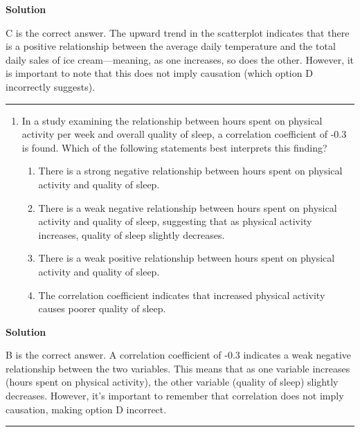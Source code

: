 \documentclass[
  letterpaper,
  DIV=11,
  numbers=noendperiod,
  oneside]{scrreprt}
\providecommand{\tightlist}{%
  \setlength{\itemsep}{0pt}\setlength{\parskip}{0pt}}\usepackage{longtable,booktabs,array}
\begin{document}
\textbf{Solution}

C is the correct answer. The upward trend in the scatterplot indicates
that there is a positive relationship between the average daily
temperature and the total daily sales of ice cream---meaning, as one
increases, so does the other. However, it is important to note that this
does not imply causation (which option D incorrectly suggests).

\begin{center}\rule{0.5\linewidth}{0.5pt}\end{center}

\begin{enumerate}
\def\labelenumi{\arabic{enumi}.}
\setcounter{enumi}{3}
\tightlist
\item
  In a study examining the relationship between hours spent on physical
  activity per week and overall quality of sleep, a correlation
  coefficient of -0.3 is found. Which of the following statements best
  interprets this finding?

  \begin{enumerate}
  \def\labelenumii{\alph{enumii}.}
  \tightlist
  \item
    There is a strong negative relationship between hours spent on
    physical activity and quality of sleep.
  \item
    There is a weak negative relationship between hours spent on
    physical activity and quality of sleep, suggesting that as physical
    activity increases, quality of sleep slightly decreases.
  \item
    There is a weak positive relationship between hours spent on
    physical activity and quality of sleep.
  \item
    The correlation coefficient indicates that increased physical
    activity causes poorer quality of sleep.
  \end{enumerate}
\end{enumerate}

\textbf{Solution}

B is the correct answer. A correlation coefficient of -0.3 indicates a
weak negative relationship between the two variables. This means that as
one variable increases (hours spent on physical activity), the other
variable (quality of sleep) slightly decreases. However, it's important
to remember that correlation does not imply causation, making option D
incorrect.

\begin{center}\rule{0.5\linewidth}{0.5pt}\end{center}
\end{document}
